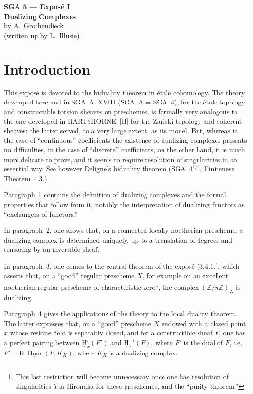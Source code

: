 \documentclass[11pt]{article}
\renewcommand{\H}{\mathrm{H}}
\DeclareMathOperator{\Hom}{Hom}
\newcommand{\R}{\mathrm{R}}
\newcommand{\Z}{\mathbb{Z}}
\providecommand{\Hom}{\operatorname{Hom}}
\providecommand{\R}{\mathrm R}
\providecommand{\Z}{\mathbb Z}
\begin{document}
\begin{center}
{\Large \textbf{SGA 5 --- Exposé I}}\\[0.4em]
{\large \textbf{Dualizing Complexes}}\\[0.3em]
by A.~Grothendieck\\
(written up by L.~Illusie)
\end{center}

\section*{Introduction}

This exposé is devoted to the biduality theorem in étale cohomology. The theory developed here and in SGA~A~XVIII (SGA~A = SGA~4), for the étale topology and constructible torsion sheaves on preschemes, is formally very analogous to the one developed in HARTSHORNE~[H] for the Zariski topology and coherent sheaves: the latter served, to a very large extent, as its model. But, whereas in the case of ``continuous'' coefficients the existence of dualizing complexes presents no difficulties, in the case of ``discrete'' coefficients, on the other hand, it is much more delicate to prove, and it seems to require resolution of singularities in an essential way. See however Deligne's biduality theorem (SGA~$4^{1/2}$, Finiteness Theorem~4.3.).

Paragraph~1 contains the definition of dualizing complexes and the formal properties that follow from it, notably the interpretation of dualizing functors as ``exchangers of functors.''

In paragraph~2, one shows that, on a connected locally noetherian prescheme, a dualizing complex is determined uniquely, up to a translation of degrees and tensoring by an invertible sheaf.

In paragraph~3, one comes to the central theorem of the exposé (3.4.1.), which asserts that, on a ``good'' regular prescheme $X$, for example on an excellent noetherian regular prescheme of characteristic zero\footnote{This last restriction will become unnecessary once one has resolution of singularities à la Hironaka for these preschemes, and the ``purity theorem.''}, the complex $(\Z/n\Z)_X$ is dualizing.

Paragraph~4 gives the applications of the theory to the local duality theorem. The latter expresses that, on a ``good'' prescheme $X$ endowed with a closed point $x$ whose residue field is separably closed, and for a constructible sheaf $F$, one has a perfect pairing between $\underline{\H}^i_x(F')$ and $\underline{\H}^{-i}_x(F)$, where $F'$ is the dual of $F$, i.e.\ $F' = \R\,\underline{\Hom}(F,K_X)$, where $K_X$ is a dualizing complex.
\end{document}
